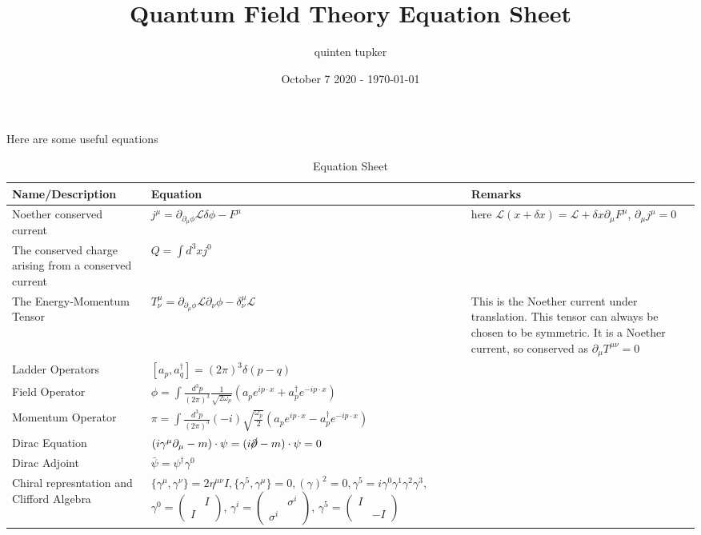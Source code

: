 \documentclass{article}
\title{Quantum Field Theory Equation Sheet}
\author{quinten tupker}
\date{October 7 2020 - \today}
\theoremstyle{definition}
\begin{document}
\maketitle

Here are some useful equations

\begin{table}[H]
  \caption{Equation Sheet}
  \begin{adjustbox}{center}
    \begin{tabular}{|p{5cm}|p{10cm}|p{5cm}|}
      \hline
      \label{equations_1}
      Name/Description & Equation & Remarks \\ \hline
      Noether conserved current & $j^\mu = \partial_{\partial_\mu \phi} \mathcal{L} \delta \phi - F^\mu$ & here $\mathcal{L}(x + \delta x) = \mathcal{L} + \delta x \partial_\mu F^\mu$, $\partial_\mu j^\mu = 0$ \\ \hline
      The conserved charge arising from a conserved current & $Q = \int d^3x j^0$ & \\ \hline
      The Energy-Momentum Tensor & $T^\mu_\nu = \partial_{\partial_\mu \phi} \mathcal{L} \partial_\nu \phi - \delta^\mu_\nu \mathcal{L}$ & This is the Noether current under translation. This tensor can always be chosen to be symmetric. It is a Noether current, so conserved as $\partial_\mu T^{\mu \nu} = 0$ \\ \hline
      Ladder Operators & $[a_p, a_q^\dagger] = (2\pi)^3 \delta(p - q)$ & \\ \hline
      Field Operator & $\phi = \int \frac{d^3p}{(2\pi)^3} \frac{1}{\sqrt{2\omega_p}} (a_p e^{i p \cdot x} + a_p^\dagger e^{-i p \cdot x})$ & \\ \hline
      Momentum Operator & $\pi = \int \frac{d^3p}{(2\pi)^3} (-i) \sqrt{\frac{\omega_p}{2}} (a_p e^{i p \cdot x} - a_p^\dagger e^{-ip \cdot x})$ & \\ \hline
      Dirac Equation & $(i \gamma^\mu \partial_\mu - m) \cdot \psi = (i \cancel{\partial} - m) \cdot \psi = 0$ & \\ \hline
      Dirac Adjoint & $\bar{\psi} = \psi^\dagger \gamma^0$ & \\ \hline
      Chiral represntation and Clifford Algebra & $\{\gamma^\mu, \gamma^\nu \} = 2\eta^{\mu \nu}I, \{\gamma^5, \gamma^\mu\} = 0, (\gamma)^2 = 0, \gamma^5 = i\gamma^0 \gamma^1 \gamma^2 \gamma^3$, $\gamma^0 = \begin{pmatrix} & I \\ I & \end{pmatrix}$, $\gamma^i = \begin{pmatrix} & \sigma^i \\ \sigma^i & \end{pmatrix}$, $\gamma^5 = \begin{pmatrix} I & \\ & -I \end{pmatrix}$ & \\ \hline

\end{tabular}
\end{adjustbox}
\end{table}
\end{document}

